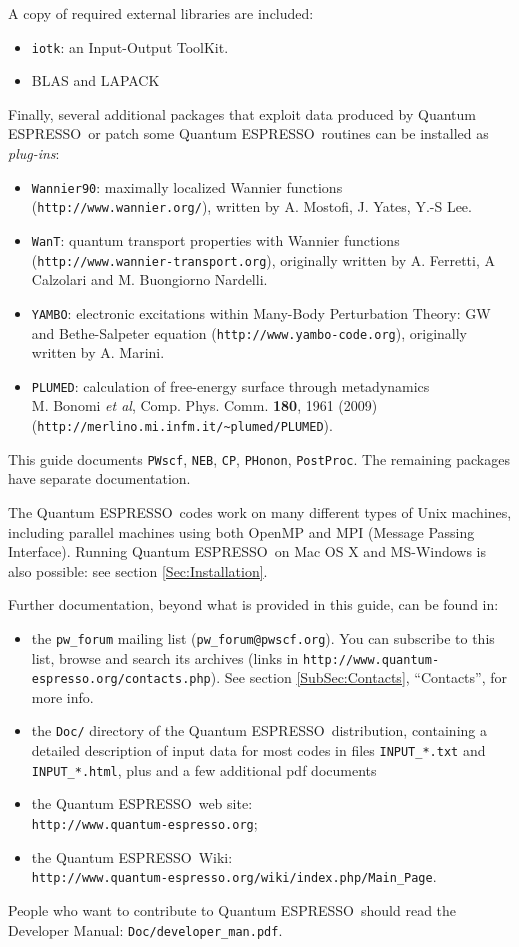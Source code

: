\documentclass[12pt,a4paper]{article}
\def\qe{{\sc Quantum ESPRESSO}}
\def\PWscf{\texttt{PWscf}}
\def\PHonon{\texttt{PHonon}}
\def\CP{\texttt{CP}}
\def\PostProc{\texttt{PostProc}}
\begin{document}
A copy of required external libraries are included:
\begin{itemize}
\item \texttt{iotk}:
      an Input-Output ToolKit.
\item BLAS and LAPACK
\end{itemize}
Finally, several additional packages that exploit data produced by \qe\ 
or patch some \qe\ routines can be installed as {\em plug-ins}:
\begin{itemize}
\item \texttt{Wannier90}:
      maximally localized Wannier functions
      (\texttt{http://www.wannier.org/}), written by A. Mostofi, 
     J. Yates, Y.-S Lee.
\item \texttt{WanT}:
      quantum transport properties with Wannier functions \\
      (\texttt{http://www.wannier-transport.org}), originally written by A. Ferretti, 
      A Calzolari and M. Buongiorno Nardelli.
\item \texttt{YAMBO}:
      electronic excitations within Many-Body Perturbation Theory: GW and Bethe-Salpeter equation 
      (\texttt{http://www.yambo-code.org}), originally written by A. Marini.
\item \texttt{PLUMED}:
      calculation of free-energy surface through metadynamics \\
      M. Bonomi {\it et al}, Comp. Phys. Comm. {\bf 180}, 1961 (2009) \\
      (\texttt{http://merlino.mi.infm.it/\~{}plumed/PLUMED}).
\end{itemize}
This guide documents \PWscf, \texttt{NEB}, \CP, \PHonon, \PostProc.
The remaining packages have separate documentation.

The \qe\ codes work on many different types of Unix machines,
including parallel machines using both OpenMP and MPI 
(Message Passing Interface).
Running \qe\ on Mac OS X and MS-Windows is also possible: 
see section \ref{Sec:Installation}.

Further documentation, beyond what is provided in this guide, can be found in:
\begin{itemize}
\item the \texttt{pw\_forum} mailing list (\texttt{pw\_forum@pwscf.org}).
   You can subscribe to this list, browse and search its archives
   (links in \texttt{http://www.quantum-espresso.org/contacts.php}).
   See section \ref{SubSec:Contacts}, ``Contacts'', for more info.
  \item the \texttt{Doc/} directory of the \qe\ distribution,
   containing a detailed description of input data for most codes
   in files \texttt{INPUT\_*.txt} and \texttt{INPUT\_*.html},
   plus and a few additional pdf documents
  \item the \qe\ web site:\\
   \texttt{http://www.quantum-espresso.org};
  \item the \qe\ Wiki:\\
   \texttt{http://www.quantum-espresso.org/wiki/index.php/Main\_Page}.
\end{itemize}
People who want to contribute to \qe\ should read the 
Developer Manual: \texttt{Doc/developer\_man.pdf}.
\end{document}

